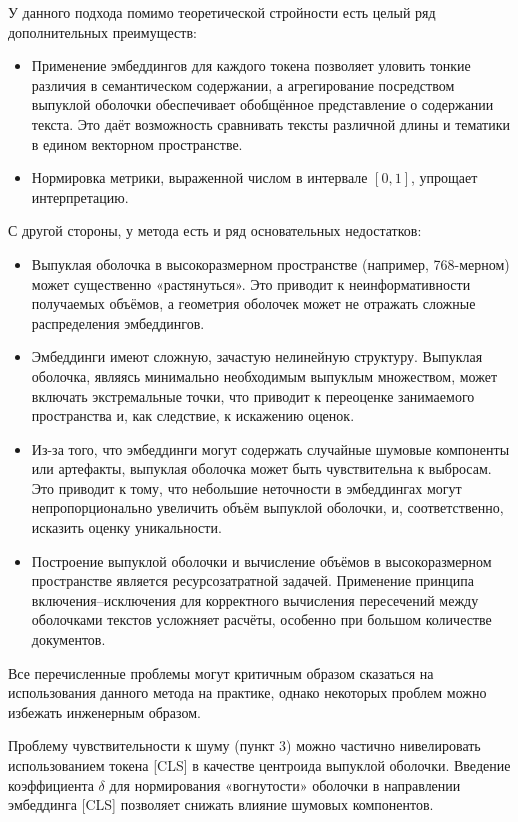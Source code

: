 У данного подхода помимо теоретической стройности есть целый ряд дополнительных преимуществ:
\begin{itemize}
    \item Применение эмбеддингов для каждого токена позволяет уловить тонкие различия
    в семантическом содержании, а агрегирование посредством выпуклой оболочки обеспечивает
    обобщённое представление о содержании текста. Это даёт возможность сравнивать тексты
    различной длины и тематики в едином векторном пространстве.
    \item Нормировка метрики, выраженной числом в интервале $[0,1]$, упрощает интерпретацию.
\end{itemize}

С другой стороны, у метода есть и ряд основательных недостатков:

\begin{itemize}
    \item Выпуклая оболочка в высокоразмерном пространстве (например, 768-мерном) может существенно «растянуться».
    Это приводит к неинформативности получаемых объёмов, а геометрия оболочек может не отражать сложные распределения эмбеддингов.
    \item Эмбеддинги имеют сложную, зачастую нелинейную структуру. Выпуклая оболочка, являясь минимально необходимым выпуклым множеством,
    может включать экстремальные точки, что приводит к переоценке занимаемого пространства и, как следствие, к искажению оценок.
    \item Из-за того, что эмбеддинги могут содержать случайные шумовые компоненты или артефакты, выпуклая оболочка может быть чувствительна к выбросам.
    Это приводит к тому, что небольшие неточности в эмбеддингах могут непропорционально увеличить объём выпуклой оболочки, и, соответственно, исказить оценку уникальности.
    \item Построение выпуклой оболочки и вычисление объёмов в высокоразмерном пространстве является ресурсозатратной задачей. Применение принципа включения–исключения для
    корректного вычисления пересечений между оболочками текстов усложняет расчёты, особенно при большом количестве документов.
\end{itemize}

Все перечисленные проблемы могут критичным образом сказаться на использования данного метода на практике, однако некоторых проблем можно избежать инженерным образом.

Проблему чувствительности к шуму (пункт 3) можно частично нивелировать использованием токена [CLS] в качестве
центроида выпуклой оболочки. Введение коэффициента $\delta$ для нормирования «вогнутости» оболочки в направлении
эмбеддинга [CLS] позволяет снижать влияние шумовых компонентов.

